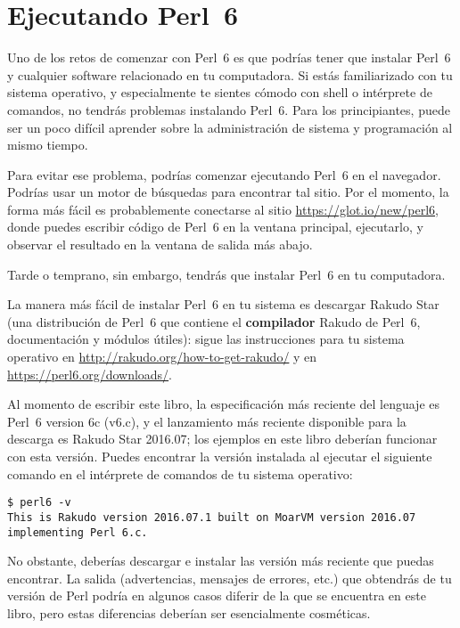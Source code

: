 \section{Ejecutando Perl~6}
\label{running_perl_6}

Uno de los retos de comenzar con Perl~6 es que podrías tener que instalar
Perl~6 y cualquier software relacionado en tu computadora. Si estás familiarizado
con tu sistema operativo, y especialmente te sientes cómodo con shell o
intérprete de comandos, no tendrás problemas instalando Perl~6. Para los 
principiantes, puede ser un poco difícil aprender sobre la
administración de sistema y programación al mismo tiempo.

Para evitar ese problema, podrías comenzar ejecutando Perl~6 en
el navegador. Podrías usar un motor de búsquedas para encontrar tal
sitio. Por el momento, la forma más fácil es probablemente conectarse
al sitio \url{https://glot.io/new/perl6}, donde puedes escribir código
de Perl~6 en la ventana principal, ejecutarlo, y observar el resultado 
en la ventana de salida más abajo.

Tarde o temprano, sin embargo, tendrás que instalar Perl~6 en tu computadora.

La manera más fácil de instalar Perl~6 en tu sistema es descargar 
Rakudo Star (una distribución de Perl~6 que contiene el {\bf compilador}
Rakudo de Perl~6, documentación y módulos útiles): sigue las instrucciones 
para tu sistema operativo en
\url{http://rakudo.org/how-to-get-rakudo/} y en 
\url{https://perl6.org/downloads/}. 

Al momento de escribir este libro, la especificación más reciente del 
lenguaje es Perl~6 version 6c (v6.c), y el lanzamiento más reciente disponible
para la descarga es Rakudo Star 2016.07; los ejemplos en este libro deberían
funcionar con esta versión. Puedes encontrar la versión instalada al ejecutar
el siguiente comando en el intérprete de comandos de tu sistema operativo:
\begin{verbatim}
$ perl6 -v
This is Rakudo version 2016.07.1 built on MoarVM version 2016.07
implementing Perl 6.c.
\end{verbatim}

No obstante, deberías descargar e instalar las versión más reciente que puedas
encontrar. La salida (advertencias, mensajes de errores, etc.) que obtendrás de tu versión de Perl
podría en algunos casos diferir de la que se encuentra en este libro, pero estas diferencias
deberían ser esencialmente cosméticas.

